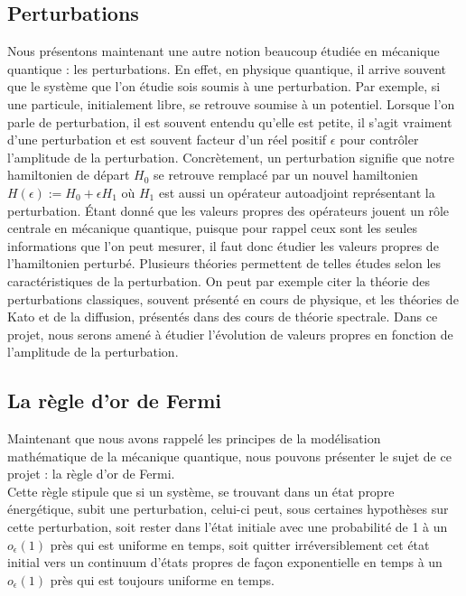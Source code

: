 \documentclass[12pt,openany,a4paper, titlepage]{article}
\theoremstyle{definition}
\theoremstyle{definition}
\theoremstyle{definition}
\theoremstyle{definition}
\theoremstyle{definition}
\theoremstyle{definition}
\begin{document}
\subsection{Perturbations}

Nous présentons maintenant une autre notion beaucoup étudiée en mécanique quantique : les perturbations.
En effet, en physique quantique, il arrive souvent que le système que l'on étudie sois soumis à une perturbation. Par exemple, si une particule, initialement libre, se retrouve soumise à un potentiel. Lorsque l'on parle de perturbation, il est souvent entendu qu'elle est petite, il s'agit vraiment d'une perturbation et est souvent facteur d'un réel positif $\epsilon$ pour contrôler l'amplitude de la perturbation.
Concrètement, un perturbation signifie que notre hamiltonien de départ $H_0$ se retrouve remplacé par un nouvel hamiltonien $H(\epsilon) := H_0 + \epsilon H_1$ où $H_1$ est aussi un opérateur autoadjoint représentant la perturbation. Étant donné que les valeurs propres des opérateurs jouent un rôle centrale en mécanique quantique, puisque pour rappel ceux sont les seules informations que l'on peut mesurer, il faut donc étudier les valeurs propres de l'hamiltonien perturbé. Plusieurs théories permettent de telles études selon les caractéristiques de la perturbation. On peut par exemple citer la théorie des perturbations classiques, souvent présenté en cours de physique, et les théories de Kato et de la diffusion, présentés dans des cours de théorie spectrale. Dans ce projet, nous serons amené à étudier l'évolution de valeurs propres en fonction de l'amplitude de la perturbation.

\newpage
\subsection{La règle d'or de Fermi} 

Maintenant que nous avons rappelé les principes de la modélisation mathématique de la mécanique quantique, nous pouvons présenter le sujet de ce projet : la règle d'or de Fermi. \\

Cette règle stipule que si un système, se trouvant dans un état propre énergétique, subit une perturbation, celui-ci peut, sous certaines hypothèses sur cette perturbation, soit rester dans l'état initiale avec une probabilité de 1 à un $o_\epsilon(1)$ près qui est uniforme en temps, soit quitter irréversiblement cet état initial vers un continuum d'états propres de façon exponentielle en temps à un $o_\epsilon(1)$ près qui est toujours uniforme en temps.\\
\end{document}
